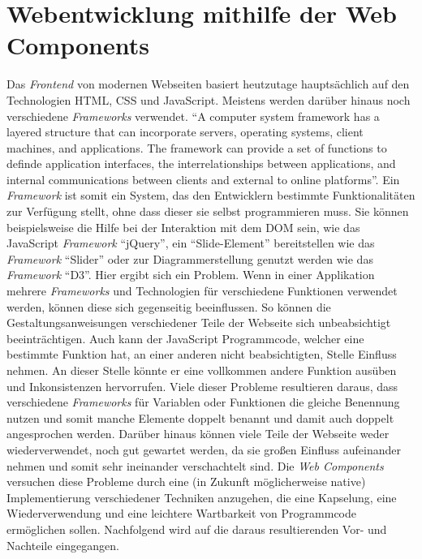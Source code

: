 \documentclass[12pt, paper=a4, bibtotoc, toc=listof, headsepline=true]{scrreprt}
\begin{document}
		\section{Webentwicklung mithilfe der Web Components}
		Das \emph{Frontend} von modernen Webseiten basiert heutzutage hauptsächlich auf den Technologien \ac{HTML}, \ac{CSS} und JavaScript. Meistens werden darüber hinaus noch verschiedene \emph{Frameworks} verwendet. \enquote{A computer system framework has a layered structure that can incorporate servers, operating systems, client machines, and applications. The framework can provide a set of functions to definde application interfaces, the interrelationships between applications, and internal communications between clients and external to online platforms}\cite[S.15]{stuart2013roadmap}. Ein \emph{Framework} ist somit ein System, das den Entwicklern bestimmte Funktionalitäten zur Verfügung stellt, ohne dass dieser sie selbst programmieren muss. Sie können beispielsweise die Hilfe bei der Interaktion mit dem \ac{DOM} sein, wie das JavaScript \emph{Framework} \enquote{jQuery}, ein \enquote{Slide-Element} bereitstellen wie das \emph{Framework} \enquote{Slider} oder zur Diagrammerstellung genutzt werden wie das \emph{Framework} \enquote{D3}. Hier ergibt sich ein Problem. Wenn in einer Applikation mehrere \emph{Frameworks} und Technologien für verschiedene Funktionen verwendet werden, können diese sich gegenseitig beeinflussen. So können die Gestaltungsanweisungen verschiedener Teile der Webseite sich unbeabsichtigt beeinträchtigen. Auch kann der  JavaScript Programmcode, welcher eine bestimmte Funktion hat, an einer anderen nicht beabsichtigten, Stelle Einfluss nehmen. An dieser Stelle könnte er eine vollkommen andere Funktion ausüben und Inkonsistenzen hervorrufen. Viele dieser Probleme resultieren daraus, dass verschiedene \emph{Frameworks} für Variablen oder Funktionen die gleiche Benennung nutzen und somit manche Elemente doppelt benannt und damit auch doppelt angesprochen werden. Darüber hinaus können viele Teile der Webseite weder wiederverwendet, noch gut gewartet werden, da sie großen Einfluss aufeinander nehmen und somit sehr ineinander verschachtelt sind.
		Die \emph{Web Components} versuchen diese Probleme durch eine (in Zukunft möglicherweise native) Implementierung verschiedener Techniken anzugehen, die eine Kapselung, eine Wiederverwendung und eine leichtere Wartbarkeit von Programmcode ermöglichen sollen. Nachfolgend wird auf die daraus resultierenden Vor- und Nachteile eingegangen. 			
\end{document}
